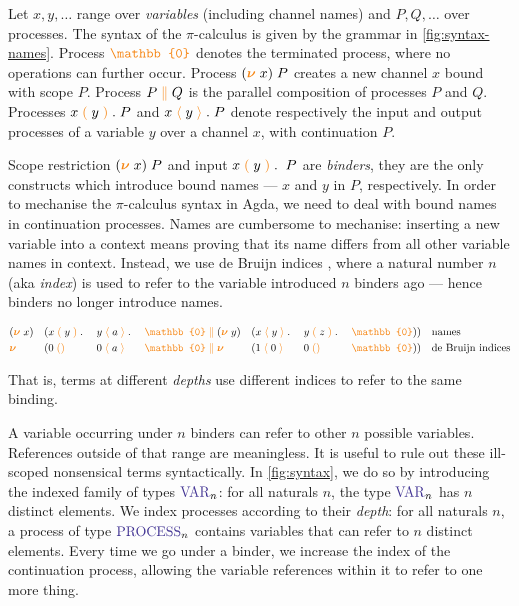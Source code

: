 \documentclass[a4paper,UKenglish,cleveref,autoref,thm-restate,authorcolumns]{lipics-v2019}
\theoremstyle{definition}
\newcommand{\picalc}{$\pi$-calculus}
\newcommand{\type}[1]{\textcolor{BlueViolet}{\operatorname{#1}}}
\newcommand{\constr}[1]{\textcolor{BurntOrange}{\operatorname{#1}}}
\newcommand{\PO}{\constr{\mathbb{0}}}
\newcommand{\comp}[2]{#1 \; \constr{\parallel} \; #2}
\newcommand{\new}{\constr{\boldsymbol{\nu}} \;}
\newcommand{\send}[2]{#1 \; \constr{\langle} \; #2 \;\constr{\rangle} \;}
\newcommand{\sendp}[2]{#1 \; \constr{\langle} \; #2 \; \constr{\rangle} \; . \;}
\newcommand{\recv}[1]{#1 \; \constr{\mathbb{()}} \;}
\newcommand{\recvp}[2]{#1 \; \constr{(} \; #2 \; \constr{)} \; . \; }
\newcommand{\Var}{\type{VAR}}
\newcommand{\Process}{\type{PROCESS}}
\begin{document}
Let $x, y,\ldots$ range over \emph{variables} (including channel names) and $P, Q,\ldots$ over processes.
The syntax of the \picalc{} \cite{Sangio01} is given by the grammar in \autoref{fig:syntax-names}.
Process $\PO$ denotes the terminated process, where no operations can further occur.
Process $(\new{}x)\; P$ creates a new channel $x$ bound with scope $P$.
Process $\comp{P}{Q}$ is the parallel composition of processes $P$ and $Q$.
Processes $\recvp{x}{y} P$ and $\sendp{x}{y} P$ denote respectively the input and output processes of a variable $y$ over a channel $x$, with continuation $P$.

Scope restriction $(\new{}x) \; P$ and input $\recvp{x}{y} \; P$ are \emph{binders}, they are the only constructs which introduce bound names --- $x$ and $y$ in $P$, respectively.
In order to mechanise the \picalc{} syntax in Agda, we need to deal with bound names in continuation processes.
Names are cumbersome to mechanise: inserting a new variable into a context means proving that its name differs from all other variable names in context.
Instead, we use de Bruijn indices \cite{deBruijn1972}, where a natural number $n$ (aka \emph{index}) is used to refer to the variable introduced $n$ binders ago --- hence binders no longer introduce names.
\begin{example}
  \begin{equation*}
    \begin{split}
      & (\new{}x ) && (\comp {\recvp{x}{y} && \sendp{y}{a} && \PO} {(\new{} y) && (\sendp{x}{y} && \recvp{y}{z} && \PO)})
      && \text{names}
      \\
      & \new{} && (\comp {\recv{0} && \send{0}{a} && \PO} {\new{} && (\send{1}{0} && \recv{0} && \PO)})
      && \text{de Bruijn indices}
      \\
    \end{split}
  \end{equation*}
\end{example}
That is, terms at different \emph{depths} use different indices to refer to the same binding.

A variable occurring under $n$ binders can refer to other $n$ possible variables.
References outside of that range are meaningless.
It is useful to rule out these ill-scoped nonsensical terms syntactically.
In \autoref{fig:syntax}, we do so by introducing the indexed family of types $\Var_n$: for all naturals $n$, the type $\Var_n$ has $n$ distinct elements.
We index processes according to their \emph{depth}: for all naturals $n$, a process of type $\Process_n$ contains variables that can refer to $n$ distinct elements.
Every time we go under a binder, we increase the index of the continuation process, allowing the variable references within it to refer to one more thing.
\end{document}
